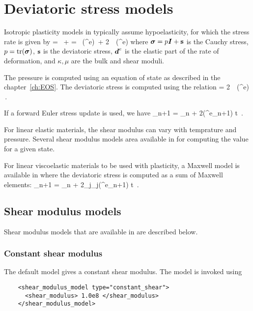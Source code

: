\chapter{Deviatoric stress models} \label{ch:DevStress}

Isotropic plasticity models in \Vaango typically assume hypoelasticity,
for which the stress rate is given by
\Beq
  \dot{\Bsig} = ~\BI + \dot{\Bs}
              = \kappa~\Tr(\BdT^e)~\BI + 2~\mu~\Dev(\BdT^e) 
\Eeq
where $\boldsymbol{\sigma} = p\boldsymbol{I} + \mathbf{s}$ is the Cauchy stress, $p = \text{tr}(\boldsymbol{\sigma})$, 
$\mathbf{s}$ is the deviatoric stress, $\boldsymbol{d}^e$ is the elastic part of
the rate of deformation, and $\kappa, \mu$ are the bulk and shear
moduli.  

The pressure is computed using an equation of state as
described in the chapter~\ref{ch:EOS}.  The deviatoric stress
is computed using the relation
\Beq
  \dot{\Bs} = 2~\mu~\Dev(\BdT^e) \,.
\Eeq

If a forward Euler stress update is used, we have
\Beq
  \Bs_{n+1} = \Bs_{n} + 2\mu\Dev(\BdT^e_{n+1}) \Delta t \,.
\Eeq

For linear elastic materials, the shear modulus can vary with temprature
and pressure.  Several shear modulus models area available in \Vaango
for computing the value for a given state.  

For linear viscoelastic materials to be used with plasticity, a Maxwell 
model is available in \Vaango where the deviatoric stress is computed 
as a sum of Maxwell elements:
\Beq
  \Bs_{n+1} = \Bs_{n} + 2\sum_j\mu_j\Dev(\BdT^e_{n+1}) \Delta t \,.
\Eeq

\section{Shear modulus models} \label{sec:ModelShear}

Shear modulus models that are available in \Vaango are described below.

  \subsection{Constant shear modulus}
  The default model gives a constant shear modulus.  The model is 
  invoked using
  \lstset{language=XML}
  \begin{lstlisting}
    <shear_modulus_model type="constant_shear">
      <shear_modulus> 1.0e8 </shear_modulus>
    </shear_modulus_model>
  \end{lstlisting}

